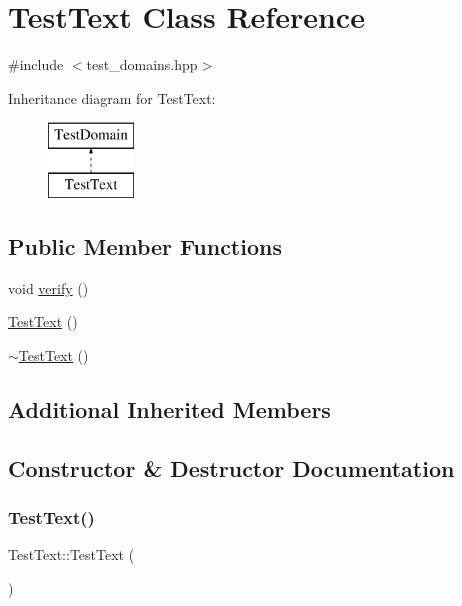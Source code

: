 \hypertarget{class_test_text}{}\section{Test\+Text Class Reference}
\label{class_test_text}


{\ttfamily \#include $<$test\+\_\+domains.\+hpp$>$}

Inheritance diagram for Test\+Text\+:\begin{figure}[H]
\begin{center}
\leavevmode
\includegraphics[height=2.000000cm]{class_test_text}
\end{center}
\end{figure}
\subsection*{Public Member Functions}
\begin{DoxyCompactItemize}
\item 
void \hyperlink{class_test_text_a31dc2a3f90d77c2db5c0278e7233f3b0}{verify} ()
\item 
\hyperlink{class_test_text_aea03a9211d87d91e33b56a46cd62a2d1}{Test\+Text} ()
\item 
\hyperlink{class_test_text_a6c7fc1f46cab52437b3d77cd7d593d40}{$\sim$\+Test\+Text} ()
\end{DoxyCompactItemize}
\subsection*{Additional Inherited Members}


\subsection{Constructor \& Destructor Documentation}
\mbox{\label{class_test_text_aea03a9211d87d91e33b56a46cd62a2d1}} 
\subsubsection{\texorpdfstring{Test\+Text()}{TestText()}}
{\footnotesize\ttfamily Test\+Text\+::\+Test\+Text (\begin{DoxyParamCaption}{ }\end{DoxyParamCaption})}

